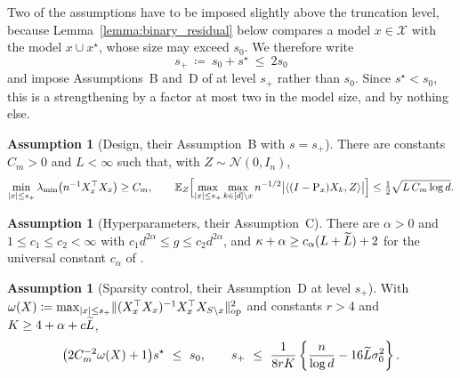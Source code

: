 \documentclass[aos]{imsart}%
\DeclarePairedDelimiter{\norm}{\lVert}{\rVert}
\DeclarePairedDelimiter{\abs}{\lvert}{\rvert}
\newcommand{\ambientspace}[0]{\mathcal{X}}
\newcommand{\bbE}[0]{\mathbb{E}}
\newcommand{\calN}[0]{\mathcal{N}}
\theoremstyle{plain}
\theoremstyle{definition}
\newtheorem{assumption}[theorem]{Assumption}
\begin{document}
    Two of the assumptions have to be imposed slightly above the truncation
    level, because Lemma~\ref{lemma:binary_residual} below compares a model
    $x\in\ambientspace$ with the model $x\cup x^{\star}$, whose size may exceed
    $s_0$. We therefore write
    \begin{equation}
        \label{eq:binary_splus}
        s_+\ \coloneq\ s_0+s^{\star}\ \leq\ 2s_0
    \end{equation}
    and impose Assumptions~B and~D of \citet{YangWainwrightJordan2016} at level
    $s_+$ rather than $s_0$. Since $s^{\star}<s_0$, this is a strengthening by
    a factor at most two in the model size, and by nothing else.

    \begin{assumption}[Design, their Assumption~B with $s=s_+$]
        \label{ass:binary_B}
        There are constants $C_m>0$ and $L<\infty$ such that, with
        $Z\sim\calN(0,I_n)$,
        \begin{equation*}
            \min_{\abs{x}\leq s_+}
            \lambda_{\min}\bigl(n^{-1}X_x^{\top}X_x\bigr)\geq C_m,
            \qquad
            \bbE_Z\Bigl[\max_{\abs{x}\leq s_+}\max_{k\in[d]\setminus x}
            n^{-1/2}\bigl|\langle(I-\Proj_x)X_k,Z\rangle\bigr|\Bigr]
            \leq\tfrac12\sqrt{L\,C_m\log d}.
        \end{equation*}
    \end{assumption}

    \begin{assumption}[Hyperparameters, their Assumption~C]
        \label{ass:binary_C}
        There are $\alpha>0$ and $1\leq c_1\leq c_2<\infty$ with
        $c_1d^{2\alpha}\leq g\leq c_2d^{2\alpha}$, and
        $\kappa+\alpha\geq c_\alpha(L+\widetilde{L})+2$ for the universal constant
        $c_\alpha$ of \citet{YangWainwrightJordan2016}.
    \end{assumption}

    \begin{assumption}[Sparsity control, their Assumption~D at level $s_+$]
        \label{ass:binary_D}
        With $\omega(X)\coloneq\max_{\abs{x}\leq
        s_+}\norm{(X_x^{\top}X_x)^{-1}X_x^{\top}X_{S\setminus x}}_{\mathrm{op}}^{2}$ and
        constants $r>4$ and $K\geq4+\alpha+c\widetilde{L}$,
        \begin{equation*}
            \bigl(2C_m^{-2}\omega(X)+1\bigr)s^\star\ \leq\ s_0,
            \qquad
            s_+\ \leq\
            \frac{1}{8rK}\left\{\frac{n}{\log d}-16\Ltil\sigma_0^{2}\right\}.
        \end{equation*}
    \end{assumption}
\end{document}
